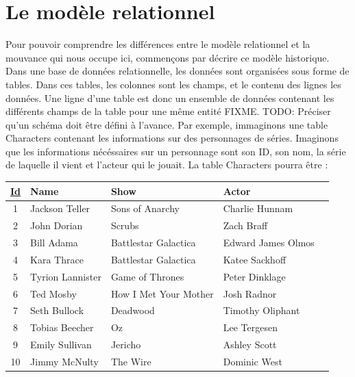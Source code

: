 \documentclass[11pt]{article}
\begin{document}
\section{Le modèle relationnel}
Pour pouvoir comprendre les différences entre le modèle relationnel et la mouvance qui nous occupe ici, commençons par décrire ce modèle historique. \\
Dans une base de données relationnelle, les données sont organisées sous forme de tables. Dans ces tables, les colonnes sont les champs, et le contenu des lignes les données. Une ligne d'une table est donc un ensemble de données contenant les différents champs de la table pour une même entité FIXME. TODO: Préciser qu'un schéma doit être défini à l'avance. Par exemple, immaginons une table Characters contenant les informations sur des personnages de séries. Imaginons que les informations nécéssaires sur un personnage sont son ID, son nom, la série de laquelle il vient et l'acteur qui le jouait. La table Characters pourra être : \\
\begin{center}
  \begin{tabular}{| c | l | l | l | l |}
    \hline
    \textbf{\underline{Id}} & \textbf{Name} & \textbf{Show} & \textbf{Actor} \\
    \hline
    \hline
    1 & Jackson Teller & Sons of Anarchy & Charlie Hunnam \\
    \hline
    2 & John Dorian & Scrubs & Zach Braff  \\
    \hline
    3 & Bill Adama & Battlestar Galactica & Edward James Olmos \\
    \hline
    4 & Kara Thrace & Battlestar Galactica & Katee Sackhoff \\
    \hline
    5 & Tyrion Lannister & Game of Thrones & Peter Dinklage \\
    \hline
    6 & Ted Mosby & How I Met Your Mother & Josh Radnor \\
    \hline
    7 & Seth Bullock & Deadwood & Timothy Oliphant \\
    \hline
    8 & Tobias Beecher & Oz & Lee Tergesen \\
    \hline
    9 & Emily Sullivan & Jericho & Ashley Scott \\
    \hline
    10 & Jimmy McNulty & The Wire & Dominic West \\
    \hline
  \end{tabular}
\end{center} 
\end{document}
